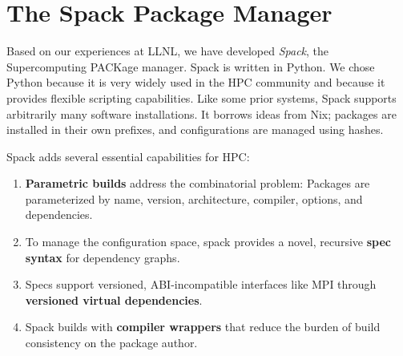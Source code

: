
\section{The Spack Package Manager}
\label{sec:implementation}
Based on our experiences at LLNL, we have developed
{\it Spack}, the Supercomputing PACKage manager.
Spack is written in Python.  We chose Python because it is
very widely used in the HPC community and because it provides
flexible scripting capabilities. 
%
Like some prior systems, Spack supports arbitrarily many software installations.
It borrows ideas from Nix; packages are installed in their own prefixes,
and configurations are managed using hashes.

\noindent
Spack adds several essential capabilities for HPC:
\begin{enumerate}
\item {\bf Parametric builds} address the combinatorial problem:
      Packages are parameterized by name, version, architecture, compiler, 
      options, and dependencies.
\item To manage the configuration space, spack provides a novel, 
      recursive {\bf spec syntax} for dependency graphs.
\item Specs support versioned, ABI-incompatible interfaces like MPI through
      {\bf versioned virtual dependencies}.
\item Spack builds with {\bf compiler wrappers} that reduce the burden of build
      consistency on the package author.
\end{enumerate}











